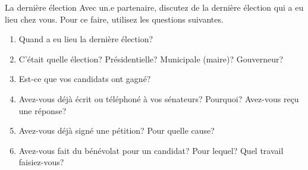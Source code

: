 \begin{frame}{La dernière élection}
  Avec un.e partenaire, discutez de \alert{la dernière élection} qui a eu lieu \alert{chez vous}.
  Pour ce faire, utilisez les questions suivantes.
  \begin{enumerate}
    \item Quand a eu lieu la dernière élection?
    \item C'était quelle élection? Présidentielle? Municipale (maire)? Gouverneur?
    \item Est-ce que vos candidats ont gagné?
    \item Avez-vous déjà écrit ou téléphoné à vos sénateurs? Pourquoi? Avez-vous reçu une réponse?
    \item Avez-vous déjà signé une pétition? Pour quelle cause?
    \item Avez-vous fait du bénévolat pour un candidat? Pour lequel? Quel travail faisiez-vous?
  \end{enumerate}
\end{frame}